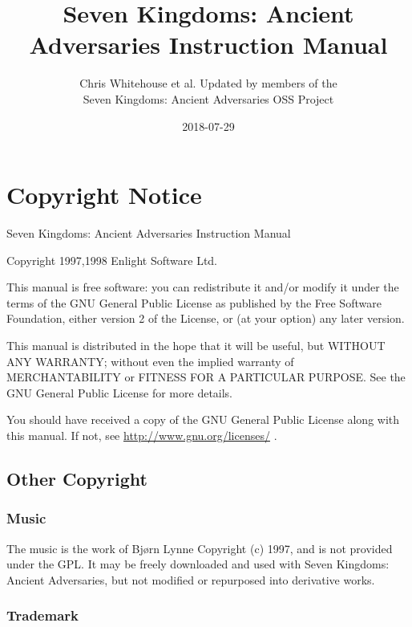 \documentclass[openany,a4paper,12pt]{book}
\begin{document}
\begin{titlepage}
	\title{Seven Kingdoms: Ancient Adversaries Instruction Manual}
	\author{Chris Whitehouse et al. Updated by members of the \\
		Seven Kingdoms: Ancient Adversaries OSS Project}
	\date{2018-07-29}
\end{titlepage}
\frontmatter
\maketitle

\section{Copyright Notice}

Seven Kingdoms: Ancient Adversaries Instruction Manual

Copyright 1997,1998 Enlight Software Ltd.

This manual is free software: you can redistribute it and/or modify it under the terms of the GNU General Public License as published by the Free Software Foundation, either version 2 of the License, or (at your option) any later version.

This manual is distributed in the hope that it will be useful, but WITHOUT ANY WARRANTY; without even the implied warranty of MERCHANTABILITY or FITNESS FOR A PARTICULAR PURPOSE.  See the GNU General Public License for more details.

You should have received a copy of the GNU General Public License along with this manual.  If not, see \href{<http://www.gnu.org/licenses/>}{http://www.gnu.org/licenses/} .

\subsection{Other Copyright}

\subsubsection{Music}

The music is the work of Bjørn Lynne Copyright (c) 1997, and is not provided under the GPL. It may be freely downloaded and used with Seven Kingdoms: Ancient Adversaries, but not modified or repurposed into derivative works. 

\subsubsection{Trademark}
\end{document}
